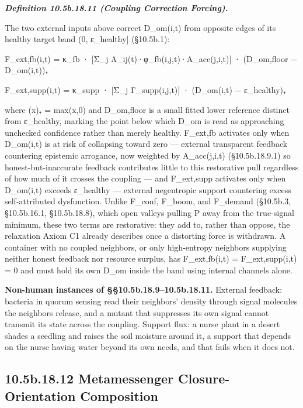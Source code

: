 \documentclass[
]{article}
\begin{document}
\emph{\textbf{Definition 10.5b.18.11 (Coupling Correction Forcing).}}

The two external inputs above correct D\_om(i,t) from opposite edges of
its healthy target band (0, ε\_healthy{]} (§10.5b.1):

F\_ext,fb(i,t) = κ\_fb · {[}Σ\_j Λ\_ij(t)·φ\_fb(i,j,t)·A\_acc(j,i,t){]}
· (D\_om,floor − D\_om(i,t))₊

F\_ext,supp(i,t) = κ\_supp · {[}Σ\_j Γ\_supp(i,j,t){]} · (D\_om(i,t) −
ε\_healthy)₊

where (x)₊ = max(x,0) and D\_om,floor is a small fitted lower reference
distinct from ε\_healthy, marking the point below which D\_om is read as
approaching unchecked confidence rather than merely healthy. F\_ext,fb
activates only when D\_om(i,t) is at risk of collapsing toward zero ---
external transparent feedback countering epistemic arrogance, now
weighted by A\_acc(j,i,t) (§10.5b.18.9.1) so honest-but-inaccurate
feedback contributes little to this restorative pull regardless of how
much of it crosses the coupling --- and F\_ext,supp activates only when
D\_om(i,t) exceeds ε\_healthy --- external negentropic support
countering excess self-attributed dysfunction. Unlike F\_conf, F\_boom,
and F\_demand (§10.5b.3, §10.5b.16.1, §10.5b.18.8), which open valleys
pulling P away from the true-signal minimum, these two terms are
restorative: they add to, rather than oppose, the relaxation Axiom C1
already describes once a distorting force is withdrawn. A container with
no coupled neighbors, or only high-entropy neighbors supplying neither
honest feedback nor resource surplus, has F\_ext,fb(i,t) =
F\_ext,supp(i,t) = 0 and must hold its own D\_om inside the band using
internal channels alone.

\textbf{Non-human instances of §§10.5b.18.9--10.5b.18.11.} External
feedback: bacteria in quorum sensing read their neighbors' density
through signal molecules the neighbors release, and a mutant that
suppresses its own signal cannot transmit its state across the coupling.
Support flux: a nurse plant in a desert shades a seedling and raises the
soil moisture around it, a support that depends on the nurse having
water beyond its own needs, and that fails when it does not.

\hypertarget{b.18.12-metamessenger-closure-orientation-composition}{%
\subsection{10.5b.18.12 Metamessenger Closure-Orientation
Composition}\label{b.18.12-metamessenger-closure-orientation-composition}}
\end{document}
